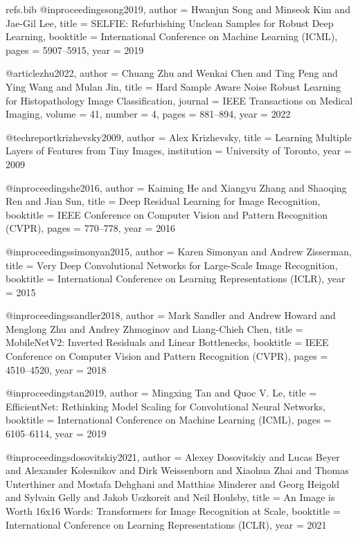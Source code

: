 \begin{filecontents*}[overwrite]{refs.bib}
@inproceedings{song2019,
  author    = {Hwanjun Song and Minseok Kim and Jae-Gil Lee},
  title     = {{SELFIE}: Refurbishing Unclean Samples for Robust Deep Learning},
  booktitle = {International Conference on Machine Learning (ICML)},
  pages     = {5907--5915},
  year      = {2019}
}

@article{zhu2022,
  author  = {Chuang Zhu and Wenkai Chen and Ting Peng and Ying Wang and Mulan Jin},
  title   = {Hard Sample Aware Noise Robust Learning for Histopathology Image Classification},
  journal = {IEEE Transactions on Medical Imaging},
  volume  = {41},
  number  = {4},
  pages   = {881--894},
  year    = {2022}
}

@techreport{krizhevsky2009,
  author      = {Alex Krizhevsky},
  title       = {Learning Multiple Layers of Features from Tiny Images},
  institution = {University of Toronto},
  year        = {2009}
}

@inproceedings{he2016,
  author    = {Kaiming He and Xiangyu Zhang and Shaoqing Ren and Jian Sun},
  title     = {Deep Residual Learning for Image Recognition},
  booktitle = {IEEE Conference on Computer Vision and Pattern Recognition (CVPR)},
  pages     = {770--778},
  year      = {2016}
}

@inproceedings{simonyan2015,
  author    = {Karen Simonyan and Andrew Zisserman},
  title     = {Very Deep Convolutional Networks for Large-Scale Image Recognition},
  booktitle = {International Conference on Learning Representations (ICLR)},
  year      = {2015}
}

@inproceedings{sandler2018,
  author    = {Mark Sandler and Andrew Howard and Menglong Zhu and Andrey Zhmoginov and Liang-Chieh Chen},
  title     = {{MobileNetV2}: Inverted Residuals and Linear Bottlenecks},
  booktitle = {IEEE Conference on Computer Vision and Pattern Recognition (CVPR)},
  pages     = {4510--4520},
  year      = {2018}
}

@inproceedings{tan2019,
  author    = {Mingxing Tan and Quoc V. Le},
  title     = {{EfficientNet}: Rethinking Model Scaling for Convolutional Neural Networks},
  booktitle = {International Conference on Machine Learning (ICML)},
  pages     = {6105--6114},
  year      = {2019}
}

@inproceedings{dosovitskiy2021,
  author    = {Alexey Dosovitskiy and Lucas Beyer and Alexander Kolesnikov and Dirk Weissenborn and Xiaohua Zhai and Thomas Unterthiner
               and Mostafa Dehghani and Matthias Minderer and Georg Heigold and Sylvain Gelly and Jakob Uszkoreit and Neil Houlsby},
  title     = {An Image is Worth 16x16 Words: Transformers for Image Recognition at Scale},
  booktitle = {International Conference on Learning Representations (ICLR)},
  year      = {2021}
}


\end{filecontents*}
